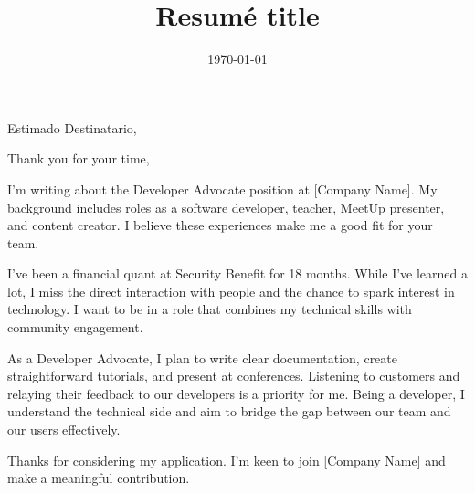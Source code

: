\documentclass[11pt,a4paper,sans]{moderncv}        %
\title{Resumé title}
\begin{document}
\date{\today}
\opening{Estimado Destinatario,}
\closing{Thank you for your time,}
\makelettertitle

I'm writing about the Developer Advocate position at [Company Name]. My background
includes roles as a software developer, teacher, MeetUp presenter, and content
creator. I believe these experiences make me a good fit for your team.

I've been a financial quant at Security Benefit for 18 months. While I've learned
a lot, I miss the direct interaction with people and the chance to spark interest
in technology. I want to be in a role that combines my technical skills with
community engagement.

As a Developer Advocate, I plan to write clear documentation, create straightforward
tutorials, and present at conferences. Listening to customers and relaying their
feedback to our developers is a priority for me. Being a developer, I understand
the technical side and aim to bridge the gap between our team and our users effectively.

Thanks for considering my application. I'm keen to join [Company Name] and make
a meaningful contribution.

\vspace{0.5cm}


\makeletterclosing
\end{document}
